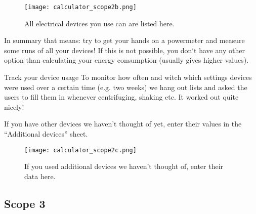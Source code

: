 \begin{figure}[h!]
	\centering
	\texttt{[image: calculator\_scope2b.png]}%
	\caption{All electrical devices you use can are listed here.}%
\end{figure}

In summary that means: try to get your hands on a powermeter and measure some runs of all your devices! If this is not possible, you don`t have any other option than calculating your energy consumption (usually gives higher values). 

\begin{suggest}{Track your device usage}
	To monitor how often and witch which settings devices were used over a certain time (e.g. two weeks) we hang out lists and asked the users to fill them in whenever centrifuging, shaking etc. It worked out quite nicely!
\end{suggest}

If you have other devices we haven’t thought of yet, enter their values in the “Additional devices” sheet.
	
\begin{figure}[h!]
	\centering
	\texttt{[image: calculator\_scope2c.png]}%
	\caption{If you used additional devices we haven't thought of, enter their data here.}%
\end{figure}

\clearpage
\subsection{Scope 3}

